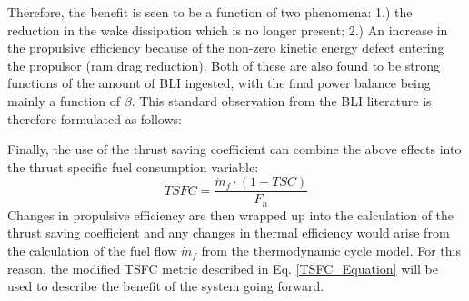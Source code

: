 					Therefore, the benefit is seen to be a function of two phenomena:  1.) the reduction in the wake dissipation which is no longer present; 2.) An increase in the propulsive efficiency because of the non-zero kinetic energy defect entering the propulsor (ram drag reduction).  Both of these are also found to be strong functions of the amount of BLI ingested, with the final power balance being mainly a function of $\beta$.  This standard observation from the BLI literature is therefore formulated as follows:
															
					\vspace{1pt}
					\vspace{5mm}
					
					Finally, the use of the thrust saving coefficient can combine the above effects into the thrust specific fuel consumption variable:
					\begin{equation}
						TSFC = \frac{\dot{m}_f \cdot (1-TSC)}{F_n}
						\label{TSFC_Equation}
					\end{equation}
					Changes in propulsive efficiency are then wrapped up into the calculation of the thrust saving coefficient and any changes in thermal efficiency would arise from the calculation of the fuel flow $\dot{m}_f$ from the thermodynamic cycle model.  For this reason, the modified TSFC metric described in Eq. \ref{TSFC_Equation} will be used to describe the benefit of the system going forward.
					
